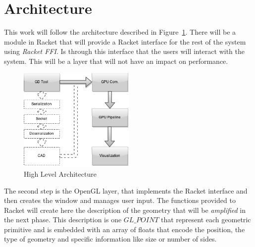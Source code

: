 
%
%

\section{Architecture} %
\label{sec:architecture}

This work will follow the architecture described in Figure~\ref{fig:architecture}.
There will be a module in Racket that will provide a Racket interface for the rest of the system using \emph{Racket FFI}. Is through this interface that the users will interact with the system. This will be a layer that will not have an impact on performance.


\begin{figure}
	\vspace{-15pt}
    \centering
	\includegraphics[width=0.5\textwidth]{img/Architecture/GD-Fast-Pipeline.png}
	\caption{High Level Architecture}
	\label{fig:architecture}
	\vspace{-15pt}
\end{figure}

The second step is the OpenGL layer, that implements the Racket interface and then creates the window and manages user input. The functions provided to Racket will create here the description of the geometry that will be \emph{amplified} in the next phase. This description is one $GL\_POINT$ that represent each geometric primitive and is embedded with an array of floats that encode the position, the type of geometry and specific information like size or number of sides. 

